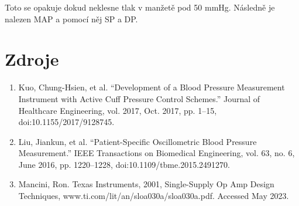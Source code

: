 \documentclass[a4paper,10pt]{article}
\begin{document}
Toto se opakuje dokud neklesne tlak v manžetě pod 50 mmHg. Následně je nalezen MAP a pomocí něj SP a DP.

\newpage
\section{Zdroje}
\begin{enumerate}
 \item Kuo, Chung-Hsien, et al. “Development of a Blood Pressure Measurement Instrument with Active Cuff Pressure Control Schemes.” Journal of Healthcare Engineering, vol. 2017, Oct. 2017, pp. 1–15, doi:10.1155/2017/9128745.

 \item Liu, Jiankun, et al. “Patient-Specific Oscillometric Blood Pressure Measurement.” IEEE Transactions on Biomedical Engineering, vol. 63, no. 6, June 2016, pp. 1220–1228, doi:10.1109/tbme.2015.2491270.

 \item Mancini, Ron. Texas Instruments, 2001, Single-Supply Op Amp Design Techniques, www.ti.com/lit/an/sloa030a/sloa030a.pdf. Accessed May 2023.

\end{enumerate}
\end{document}
